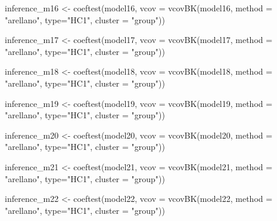 \documentclass[a4paper,nobind]{templates/ociamthesis}
\newenvironment{Shaded}{\begin{snugshade}}{\end{snugshade}}
\newcommand{\AttributeTok}[1]{\textcolor[rgb]{0.77,0.63,0.00}{#1}}
\newcommand{\FunctionTok}[1]{\textcolor[rgb]{0.00,0.00,0.00}{#1}}
\newcommand{\NormalTok}[1]{#1}
\newcommand{\OtherTok}[1]{\textcolor[rgb]{0.56,0.35,0.01}{#1}}
\newcommand{\StringTok}[1]{\textcolor[rgb]{0.31,0.60,0.02}{#1}}
\renewenvironment{Shaded}
{
  \vspace{10pt}%
  \begin{snugshade}%
}{%
  \end{snugshade}%
  \vspace{8pt}%
}
\begin{document}
\begin{Shaded}
\begin{Highlighting}[]
\NormalTok{inference\_m16 }\OtherTok{\textless{}{-}} \FunctionTok{coeftest}\NormalTok{(model16, }\AttributeTok{vcov =} \FunctionTok{vcovBK}\NormalTok{(model16, }\AttributeTok{method =} \StringTok{"arellano"}\NormalTok{, }\AttributeTok{type=}\StringTok{"HC1"}\NormalTok{, }\AttributeTok{cluster =} \StringTok{"group"}\NormalTok{))}

\NormalTok{inference\_m17 }\OtherTok{\textless{}{-}} \FunctionTok{coeftest}\NormalTok{(model17, }\AttributeTok{vcov =} \FunctionTok{vcovBK}\NormalTok{(model17, }\AttributeTok{method =} \StringTok{"arellano"}\NormalTok{, }\AttributeTok{type=}\StringTok{"HC1"}\NormalTok{, }\AttributeTok{cluster =} \StringTok{"group"}\NormalTok{))}

\NormalTok{inference\_m18 }\OtherTok{\textless{}{-}} \FunctionTok{coeftest}\NormalTok{(model18, }\AttributeTok{vcov =} \FunctionTok{vcovBK}\NormalTok{(model18, }\AttributeTok{method =} \StringTok{"arellano"}\NormalTok{, }\AttributeTok{type=}\StringTok{"HC1"}\NormalTok{, }\AttributeTok{cluster =} \StringTok{"group"}\NormalTok{))}

\NormalTok{inference\_m19 }\OtherTok{\textless{}{-}} \FunctionTok{coeftest}\NormalTok{(model19, }\AttributeTok{vcov =} \FunctionTok{vcovBK}\NormalTok{(model19, }\AttributeTok{method =} \StringTok{"arellano"}\NormalTok{, }\AttributeTok{type=}\StringTok{"HC1"}\NormalTok{, }\AttributeTok{cluster =} \StringTok{"group"}\NormalTok{))}

\NormalTok{inference\_m20 }\OtherTok{\textless{}{-}} \FunctionTok{coeftest}\NormalTok{(model20, }\AttributeTok{vcov =} \FunctionTok{vcovBK}\NormalTok{(model20, }\AttributeTok{method =} \StringTok{"arellano"}\NormalTok{, }\AttributeTok{type=}\StringTok{"HC1"}\NormalTok{, }\AttributeTok{cluster =} \StringTok{"group"}\NormalTok{))}

\NormalTok{inference\_m21 }\OtherTok{\textless{}{-}} \FunctionTok{coeftest}\NormalTok{(model21, }\AttributeTok{vcov =} \FunctionTok{vcovBK}\NormalTok{(model21, }\AttributeTok{method =} \StringTok{"arellano"}\NormalTok{, }\AttributeTok{type=}\StringTok{"HC1"}\NormalTok{, }\AttributeTok{cluster =} \StringTok{"group"}\NormalTok{))}

\NormalTok{inference\_m22 }\OtherTok{\textless{}{-}} \FunctionTok{coeftest}\NormalTok{(model22, }\AttributeTok{vcov =} \FunctionTok{vcovBK}\NormalTok{(model22, }\AttributeTok{method =} \StringTok{"arellano"}\NormalTok{, }\AttributeTok{type=}\StringTok{"HC1"}\NormalTok{, }\AttributeTok{cluster =} \StringTok{"group"}\NormalTok{))}


\end{Highlighting}
\end{Shaded}
\end{document}
